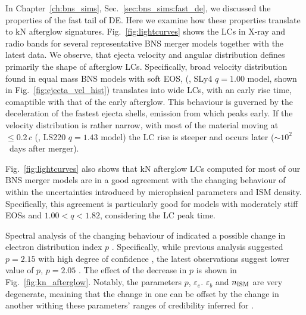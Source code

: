 In Chapter~\ref{ch:bns_sims}, Sec.~\ref{sec:bns_sims:fast_de}, we discussed the properties 
of the fast tail of \ac{DE}. Here we examine how these properties translate to \ac{kN} 
afterglow signatures. 
%
Fig.~\ref{fig:lightcurves} shows the \acp{LC} in X-ray and radio bands for several 
representative \ac{BNS} merger models together with the latest \GRB{} data. 
We observe, that ejecta velocity and angular distribution defines primarily the shape of 
afterglow \acp{LC}. 
Specifically, broad velocity distribution found in equal mass \ac{BNS} models 
with soft \ac{EOS}, (\eg, SLy4 $q=1.00$ model, shown in Fig.~\ref{fig:ejecta_vel_hist}) 
translates into wide \acp{LC}, with an early rise time, comaptible with that of the early \GRB{} afterglow. 
This behaviour is guverned by the deceleration of the fastest ejecta shells, 
emission from which peaks early. If the velocity distribution is rather narrow, with most of the 
material moving at ${\leq}0.2\,c$ (\eg, LS220 $q=1.43$ model) 
the \ac{LC} rise is steeper and occurs later (${\sim}10^2$~days after merger). 

Fig.~\ref{fig:lightcurves} also shows that \ac{kN} afterglow \acp{LC} computed 
for most of our \ac{BNS} merger models are in a good agreement with the 
changing behaviour of \GRB{} within the uncertainties introduced by microphsical 
parameters and \ac{ISM} density.
%
Specifically, this agreement is particularly good for models with moderately stiff 
\acp{EOS} and $1.00<q<1.82$, considering the \ac{LC} peak time.

Spectral analysis of the changing behaviour of \GRB{} indicated a possible 
change in electron distribution index $p$ \citep{Hajela:2021faz}. Specifically, 
while previous \GRB{} analysis suggested $p=2.15$ with high degree of confidence 
\citep[\eg][]{Hajela:2019mjy}, the latest observations suggest lower value of $p$, 
$p=2.05$ \citep{Hajela:2021faz}. 
%
The effect of the decrease in $p$ is shown in 
Fig.~\ref{fig:kn_afterglow}. Notably, the parameters $p$, $\varepsilon_e$. $\varepsilon_b$ and 
$n_{\text{ISM}}$ are very degenerate, meaining that the change in one can be offset by the change in 
another withing these parameters' ranges of credibility inferred for \GRB{}. 

